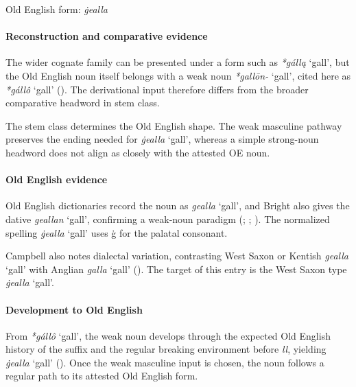 \documentclass[
  british,
  a4paper,
]{article}
\providecommand{\Recon}[1]{\emph{*#1}}
\begin{document}
Old English form: \emph{ġealla}

\paragraph{Reconstruction and comparative
evidence}\label{reconstruction-and-comparative-evidence-90}

The wider cognate family can be presented under a form such as
\Recon{gállą} `gall', but the Old English noun itself belongs with a
weak noun \emph{*gallōn-} `gall', cited here as \Recon{gállô} `gall'
(). The derivational input
therefore differs from the broader comparative headword in stem class.

The stem class determines the Old English shape. The weak masculine
pathway preserves the ending needed for \emph{ġealla} `gall', whereas a
simple strong-noun headword does not align as closely with the attested
OE noun.

\paragraph{Old English evidence}\label{old-english-evidence-90}

Old English dictionaries record the noun as {\emph{gealla}} `gall', and
Bright also gives the dative {\emph{geallan}} `gall', confirming a
weak-noun paradigm (; ;
). The
normalized spelling {\emph{ġealla}} `gall' uses ġ for the palatal
consonant.

Campbell also notes dialectal variation, contrasting West Saxon or
Kentish {\emph{gealla}} `gall' with Anglian {\emph{galla}} `gall'
(). The target of
this entry is the West Saxon type {\emph{ġealla}} `gall'.

\paragraph{Development to Old
English}\label{development-to-old-english-90}

From \Recon{gállô} `gall', the weak noun develops through the expected
Old English history of the suffix and the regular breaking environment
before \emph{ll}, yielding {\emph{ġealla}} `gall'
(). Once the weak
masculine input is chosen, the noun follows a regular path to its
attested Old English form.
\end{document}
